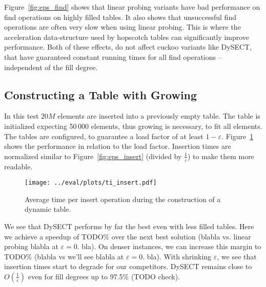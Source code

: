 \documentclass[a4paper,UKenglish]{lipics-v2016}
\begin{document}
Figure~\ref{fig:eps_find} shows that linear probing variants have bad
performance on find operations on highly filled tables.  It also shows
that unsuccessful find operations are often very slow when using
linear probing.  This is where the acceleration data-structure used by
hopscotch tables can significantly improve performance.  Both of these
effects, do not affect cuckoo variants like DySECT, that have
guaranteed constant running times for all find operations --
independent of the fill degree.

\subsection{Constructing a Table with Growing}
\label{sec:exp_ti}
In this test $20M$ elements are inserted into a previously empty
table.  The table is initialized expecting 50\,000 elements, thus
growing is necessary, to fit all elements.  The tables are configured,
to guarantee a load factor of at least
$1-\varepsilon$. Figure~\ref{fig:ti_insert} shows the performance in
relation to the load factor.  Insertion times are normalized similar to
Figure~\ref{fig:eps_insert} (divided by $\frac{1}{\varepsilon}$) to
make them more readable.

\begin{figure}[ht]
  \centering
  \texttt{[image: ../eval/plots/ti\_insert.pdf]}
  \caption{\label{fig:ti_insert}Average time per insert operation
    during the construction of a dynamic table.}
\end{figure}

We see that DySECT performs by far the best even with less filled
tables.  Here we achieve a speedup of TODO$\%$ over the next best
solution (blabla vs. linear probing blabla at $\varepsilon = 0.$ bla).
On denser instances, we can increase this margin to TODO$\%$ (blabla
vs we'll see blabla at $\varepsilon = 0.$ bla).  With shrinking
$\varepsilon$, we see that insertion times start to degrade for our
competitors.  DySECT remains close to $O(\frac{1}{\varepsilon})$ even
for fill degrees up to 97.5$\%$ (TODO check).
\end{document}
